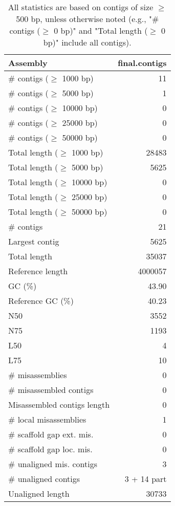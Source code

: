 \documentclass[12pt,a4paper]{article}
\begin{document}
\begin{table}[ht]
\begin{center}
\caption{All statistics are based on contigs of size $\geq$ 500 bp, unless otherwise noted (e.g., "\# contigs ($\geq$ 0 bp)" and "Total length ($\geq$ 0 bp)" include all contigs).}
\begin{tabular}{|l*{1}{|r}|}
\hline
Assembly & final.contigs \\ \hline
\# contigs ($\geq$ 1000 bp) & 11 \\ \hline
\# contigs ($\geq$ 5000 bp) & 1 \\ \hline
\# contigs ($\geq$ 10000 bp) & 0 \\ \hline
\# contigs ($\geq$ 25000 bp) & 0 \\ \hline
\# contigs ($\geq$ 50000 bp) & 0 \\ \hline
Total length ($\geq$ 1000 bp) & 28483 \\ \hline
Total length ($\geq$ 5000 bp) & 5625 \\ \hline
Total length ($\geq$ 10000 bp) & 0 \\ \hline
Total length ($\geq$ 25000 bp) & 0 \\ \hline
Total length ($\geq$ 50000 bp) & 0 \\ \hline
\# contigs & 21 \\ \hline
Largest contig & 5625 \\ \hline
Total length & 35037 \\ \hline
Reference length & 4000057 \\ \hline
GC (\%) & 43.90 \\ \hline
Reference GC (\%) & 40.23 \\ \hline
N50 & 3552 \\ \hline
N75 & 1193 \\ \hline
L50 & 4 \\ \hline
L75 & 10 \\ \hline
\# misassemblies & 0 \\ \hline
\# misassembled contigs & 0 \\ \hline
Misassembled contigs length & 0 \\ \hline
\# local misassemblies & 1 \\ \hline
\# scaffold gap ext. mis. & 0 \\ \hline
\# scaffold gap loc. mis. & 0 \\ \hline
\# unaligned mis. contigs & 3 \\ \hline
\# unaligned contigs & 3 + 14 part \\ \hline
Unaligned length & 30733 \\ \hline

\end{tabular}
\end{center}
\end{table}
\end{document}
